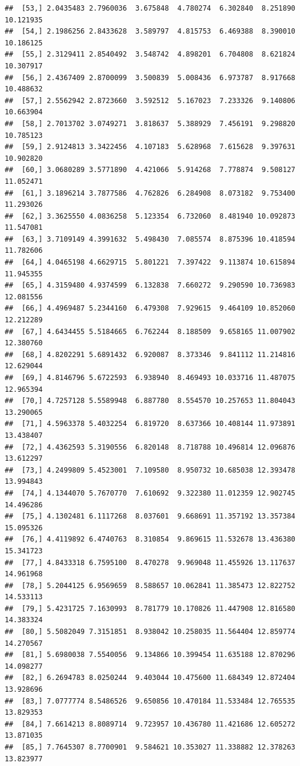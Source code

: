 \documentclass{article}\usepackage[]{graphicx}\usepackage[]{color}
\makeatletter
\newenvironment{kframe}{%
 \def\at@end@of@kframe{}%
 \ifinner\ifhmode%
  \def\at@end@of@kframe{\end{minipage}}%
  \begin{minipage}{\columnwidth}%
 \fi\fi%
 \def\FrameCommand##1{\hskip\@totalleftmargin \hskip-\fboxsep
 \colorbox{shadecolor}{##1}\hskip-\fboxsep
     \hskip-\linewidth \hskip-\@totalleftmargin \hskip\columnwidth}%
 \MakeFramed {\advance\hsize-\width
   \@totalleftmargin\z@ \linewidth\hsize
   \@setminipage}}%
 {\par\unskip\endMakeFramed%
 \at@end@of@kframe}
\newenvironment{knitrout}{}{} %
\makeatother
\begin{document}
\begin{knitrout}
\begin{kframe}
\begin{verbatim}
##  [53,] 2.0435483 2.7960036  3.675848  4.780274  6.302840  8.251890 10.121935
##  [54,] 2.1986256 2.8433628  3.589797  4.815753  6.469388  8.390010 10.186125
##  [55,] 2.3129411 2.8540492  3.548742  4.898201  6.704808  8.621824 10.307917
##  [56,] 2.4367409 2.8700099  3.500839  5.008436  6.973787  8.917668 10.488632
##  [57,] 2.5562942 2.8723660  3.592512  5.167023  7.233326  9.140806 10.663904
##  [58,] 2.7013702 3.0749271  3.818637  5.388929  7.456191  9.298820 10.785123
##  [59,] 2.9124813 3.3422456  4.107183  5.628968  7.615628  9.397631 10.902820
##  [60,] 3.0680289 3.5771890  4.421066  5.914268  7.778874  9.508127 11.052471
##  [61,] 3.1896214 3.7877586  4.762826  6.284908  8.073182  9.753400 11.293026
##  [62,] 3.3625550 4.0836258  5.123354  6.732060  8.481940 10.092873 11.547081
##  [63,] 3.7109149 4.3991632  5.498430  7.085574  8.875396 10.418594 11.782606
##  [64,] 4.0465198 4.6629715  5.801221  7.397422  9.113874 10.615894 11.945355
##  [65,] 4.3159480 4.9374599  6.132838  7.660272  9.290590 10.736983 12.081556
##  [66,] 4.4969487 5.2344160  6.479308  7.929615  9.464109 10.852060 12.212289
##  [67,] 4.6434455 5.5184665  6.762244  8.188509  9.658165 11.007902 12.380760
##  [68,] 4.8202291 5.6891432  6.920087  8.373346  9.841112 11.214816 12.629044
##  [69,] 4.8146796 5.6722593  6.938940  8.469493 10.033716 11.487075 12.965394
##  [70,] 4.7257128 5.5589948  6.887780  8.554570 10.257653 11.804043 13.290065
##  [71,] 4.5963378 5.4032254  6.819720  8.637366 10.408144 11.973891 13.438407
##  [72,] 4.4362593 5.3190556  6.820148  8.718788 10.496814 12.096876 13.612297
##  [73,] 4.2499809 5.4523001  7.109580  8.950732 10.685038 12.393478 13.994843
##  [74,] 4.1344070 5.7670770  7.610692  9.322380 11.012359 12.902745 14.496286
##  [75,] 4.1302481 6.1117268  8.037601  9.668691 11.357192 13.357384 15.095326
##  [76,] 4.4119892 6.4740763  8.310854  9.869615 11.532678 13.436380 15.341723
##  [77,] 4.8433318 6.7595100  8.470278  9.969048 11.455926 13.117637 14.961968
##  [78,] 5.2044125 6.9569659  8.588657 10.062841 11.385473 12.822752 14.533113
##  [79,] 5.4231725 7.1630993  8.781779 10.170826 11.447908 12.816580 14.383324
##  [80,] 5.5082049 7.3151851  8.938042 10.258035 11.564404 12.859774 14.270567
##  [81,] 5.6980038 7.5540056  9.134866 10.399454 11.635188 12.870296 14.098277
##  [82,] 6.2694783 8.0250244  9.403044 10.475600 11.684349 12.872404 13.928696
##  [83,] 7.0777774 8.5486526  9.650856 10.470184 11.533484 12.765535 13.829353
##  [84,] 7.6614213 8.8089714  9.723957 10.436780 11.421686 12.605272 13.871035
##  [85,] 7.7645307 8.7700901  9.584621 10.353027 11.338882 12.378263 13.823977

\end{verbatim}
\end{kframe}
\end{knitrout}
\end{document}
